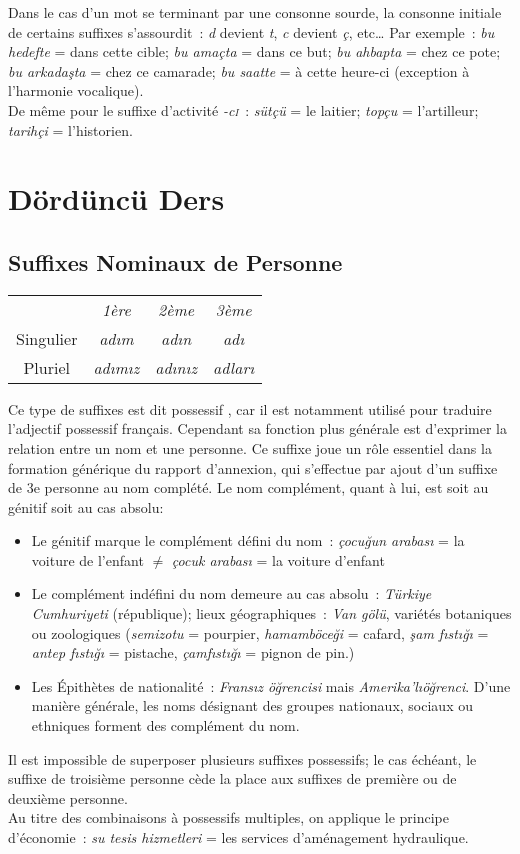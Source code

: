 \documentclass{cours}
\newcommand{\ch}{\c{s}}
\newcommand{\ug}{\u{g}}
\newcommand{\sci}{\textsc{i}}
\begin{document}
Dans le cas d'un mot se terminant par une consonne sourde, la consonne initiale de certains suffixes s'assourdit~: {\sl d} devient {\sl t}, {\sl c} devient {\sl ç}, etc\ldots
Par exemple~: \textsl{bu hedefte} = dans cette cible; \textsl{bu amaçta} = dans ce but; \textsl{bu ahbapta} = chez ce pote; \textsl{bu arkada\ch ta} = chez ce camarade; \textsl{bu saatte} = à cette heure-ci (exception à l'harmonie vocalique).\\
De même pour le suffixe d'activité \textsl{-c\sci}~: \textsl{sütçü} = le laitier; \textsl{topçu} = l'artilleur; \textsl{tarihçi} = l'historien.

\section{Dördüncü Ders}
\subsection{Suffixes Nominaux de Personne}
\begin{center}
    \begin{tabular}{c>{\sl}c>{\sl}c>{\sl}c}
                  & 1ère       & 2ème       & 3ème    \\
        Singulier & ad\i m     & ad\i n     & ad\i    \\
        Pluriel   & ad\i m\i z & ad\i n\i z & adlar\i
    \end{tabular}
\end{center}
Ce type de suffixes est dit \og possessif \fg, car il est notamment utilisé pour traduire l'adjectif possessif français. Cependant sa fonction plus générale est d'exprimer la relation entre un nom et une personne. Ce suffixe joue un rôle essentiel dans la formation générique du rapport d'annexion, qui s'effectue par ajout d'un suffixe de 3e personne au nom complété. Le nom complément, quant à lui, est soit au génitif soit au cas absolu:
\begin{itemize}
    \item Le génitif marque le complément défini du nom~: \textsl{çocu\ug un arabas\i} = la voiture de l'enfant $\neq$ \textsl{çocuk arabas\i} = la voiture d'enfant
    \item Le complément indéfini du nom demeure au cas absolu~: \textsl{Türkiye Cumhuriyeti} (république); lieux géographiques~: \textsl{Van gölü}, variétés botaniques ou zoologiques (\textsl{semizotu} = pourpier, \textsl{hamamböce\ug i} = cafard, \textsl{\ch am f\i st\i \ug \i } = \textsl{antep f\i st\i \ug \i} = pistache, \textsl{çamf\i st\i \ug \i} = pignon de pin.)
    \item Les Épithètes de nationalité~: \textsl{Frans\i z ö\ug rencisi} mais \textsl{Amerika'l\i ö\ug renci}. D'une manière générale, les noms désignant des groupes nationaux, sociaux ou ethniques forment des complément du nom.
\end{itemize}
Il est impossible de superposer plusieurs suffixes possessifs; le cas échéant, le suffixe de troisième personne cède la place aux suffixes de première ou de deuxième personne. \\
Au titre des combinaisons à possessifs multiples, on applique le principe d'économie~: \textsl{su tesis hizmetleri} = les services d'aménagement hydraulique.
\end{document}
